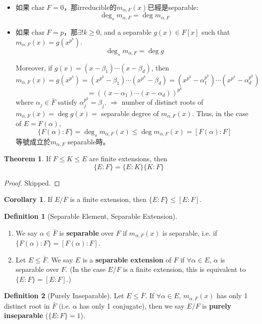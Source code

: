 \documentclass[12pt]{article}
\theoremstyle{definition}
\newtheorem{thm}{Theorem}
\newtheorem{dfn}{Definition}
\newtheorem{cor}{Corollary}
\DeclareMathOperator{\Char}{char}
\begin{document}
\begin{itemize}
	\item 如果$\Char F=0$，那irreducible的$m_{\alpha,F}(x)$已經是separable:
	      \[\deg_s m_{\alpha,F} = \deg m_{\alpha,F}\]
	\item 如果$\Char F=p$，那$\exists ! k \geq 0$, and a separable $g(x) \in F[x]$ such that $m_{\alpha, F}(x) = g(x^{p^k})$.
	      \[\deg_s m_{\alpha,F}= \deg g\]


	      Moreover, if $g(x) = (x - \beta_1) \cdots (x - \beta_d)$, then
	      \[
		      m_{\alpha, F}(x) = g(x^{p^k}) = (x^{p^k} - \beta_1) \cdots (x^{p^k} - \beta_d) = (x^{p^k} - \alpha_1^{p^k}) \cdots (x^{p^k} - \alpha_d^{p^k})
	      \]
	      \[
		      = \left( (x - \alpha_1) \cdots (x - \alpha_d) \right)^{p^k}
	      \]
	      where $\alpha_j \in \bar{F}$ satisfy $\alpha_j^{p^k} = \beta_j$.
	      $\Rightarrow$ number of distinct roots of $m_{\alpha, F}(x) = \deg g(x) =$ separable degree of $m_{\alpha, F}(x)$.
	      Thus, in the case of $E = F(\alpha)$,
	      \[
		      \{F(\alpha):F\} = \deg_s m_{\alpha, F}(x) \leq \deg m_{\alpha, F}(x) = [F(\alpha):F]
	      \]
	      等號成立於$m_{\alpha, F}$ separable時。
\end{itemize}


\begin{thm}
	If $F \leq K \leq E$ are finite extensions, then
	\[
		\{E:F\} = \{E:K\}\{K:F\}
	\]
\end{thm}

\begin{proof}
	Skipped.
\end{proof}

\begin{cor}
	If $E/F$ is a finite extension, then $\{E:F\} \leq [E:F]$.
\end{cor}

\begin{dfn}[Separable Element, Separable Extension]
	\
	\begin{enumerate}
		\item[(1)] We say $\alpha \in \bar{F}$ is \textbf{separable} over $F$ if $m_{\alpha, F}(x)$ is separable, i.e. if $\{F(\alpha):F\} = [F(\alpha):F]$.

		\item[(2)] Let $E \leq \bar{F}$.
			We say $E$ is a \textbf{separable extension} of $F$ if $\forall \alpha \in E$, $\alpha$ is separable over $F$.
			(In the case $E/F$ is a finite extension, this is equivalent to $\{E:F\} = [E:F]$.)
	\end{enumerate}

\end{dfn}
\begin{dfn}[Purely Inseparable]
	Let $E \leq \bar{F}$.
	If $\forall \alpha \in E$, $m_{\alpha, F}(x)$ has only 1 distinct root in $\bar{F}$ (i.e. $\alpha$ has only 1 conjugate), then we say $E/F$ is \textbf{purely inseparable} ($\{E:F\}=1$).
\end{dfn}
\end{document}
